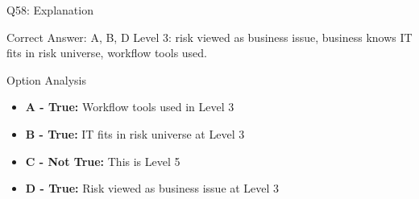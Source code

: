\documentclass{beamer}
\begin{document}
	\begin{frame}{Q58: Explanation}
		\begin{block}{Correct Answer: A, B, D}
			Level 3: risk viewed as business issue, business knows IT fits in risk universe, workflow tools used.
		\end{block}
		\begin{block}{Option Analysis}
			\begin{itemize}
				\item \textbf{A - True:} Workflow tools used in Level 3
				\item \textbf{B - True:} IT fits in risk universe at Level 3
				\item \textbf{C - Not True:} This is Level 5
				\item \textbf{D - True:} Risk viewed as business issue at Level 3
			\end{itemize}
		\end{block}
	\end{frame}
	
	
	
	
	
	
	
\end{document}
